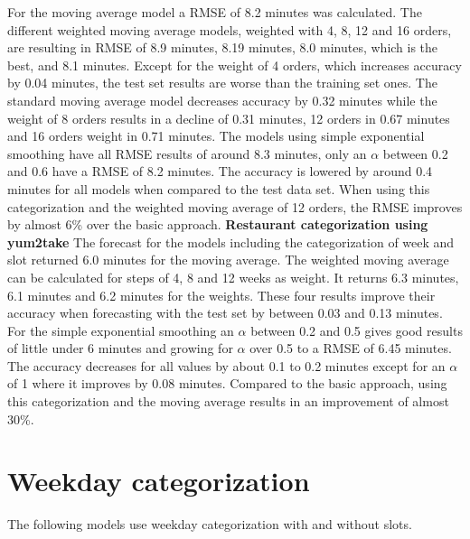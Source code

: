 For the moving average model a RMSE of 8.2 minutes was calculated. The different weighted moving average models, weighted with 4, 8, 12 and 16 orders, are resulting in RMSE of 8.9 minutes, 8.19 minutes, 8.0 minutes, which is the best, and 8.1 minutes. Except for the weight of 4 orders, which increases accuracy by 0.04 minutes, the test set results are worse than the training set ones. The standard moving average model decreases accuracy by 0.32 minutes while the weight of 8 orders results in a decline of 0.31 minutes, 12 orders in 0.67 minutes and 16 orders weight in 0.71 minutes. The models using simple exponential smoothing have all RMSE results of around 8.3 minutes, only an $\alpha$ between 0.2 and 0.6 have a RMSE of 8.2 minutes. The accuracy is lowered by around 0.4 minutes for all models when compared to the test data set.\newline
When using this categorization and the weighted moving average of 12 orders, the RMSE improves by almost 6\% over the basic approach.
\newline\newline\textbf{Restaurant categorization using yum2take}\newline
The forecast for the models including the categorization of week and slot returned 6.0 minutes for the moving average. The weighted moving average can be calculated for steps of 4, 8 and 12 weeks as weight. It returns 6.3 minutes, 6.1 minutes and 6.2 minutes for the weights. These four results improve their accuracy when forecasting with the test set by between 0.03 and 0.13 minutes. For the simple exponential smoothing an $\alpha$ between 0.2 and 0.5 gives good results of little under 6 minutes and growing for $\alpha$ over 0.5 to a RMSE of 6.45 minutes. The accuracy decreases for all values by about 0.1 to 0.2 minutes except for an $\alpha$ of 1 where it improves by 0.08 minutes.\newline
Compared to the basic approach, using this categorization and the moving average results in an improvement of almost 30\%.
\section{Weekday categorization}\label{section:Weekday categorization}
The following models use weekday categorization with and without slots.
